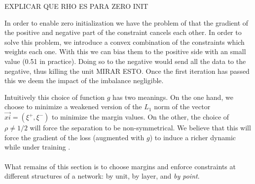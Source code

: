 EXPLICAR QUE RHO ES PARA ZERO INIT

In order to enable zero initialization we have the problem of that the gradient of the positive and negative part of the constraint cancels each other. In order to solve this problem, we introduce a convex combination of the constraints which weights each one. With this we can bias them to the positive side with an small value (0.51 in practice). Doing so to the negative would send all the data to the negative, thus killing the unit MIRAR ESTO. Once the first iteration has passed this we deem the impact of the imbalance negligible.

Intuitively this choice of function $g$ has two meanings. On the one hand, we choose to minimize a weakened version of the $L_1$ norm of the vector $\vec{xi}=(\xi^{+},\xi^{-})$ to minimize the margin values. On the other, the choice of $\rho\neq 1/2$ will force the separation to be non-symmetrical. We believe that this will force the gradient of the loss (augmented with $g$) to induce a richer dynamic while under training \cite{LeCun06atutorial}. 
\\\\
What remains of this section is to choose margins and enforce constraints at different structures of a network: by unit, by layer, and \emph{by point}.


